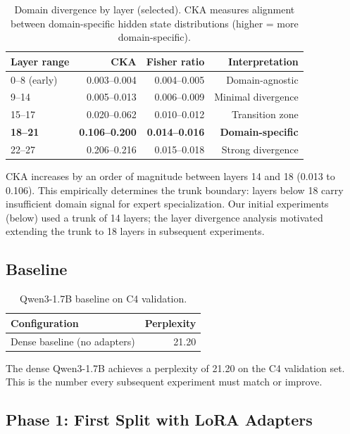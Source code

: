 \documentclass{article}
\begin{document}
\begin{table}[h]
\centering
\caption{Domain divergence by layer (selected). CKA measures alignment between
domain-specific hidden state distributions (higher = more domain-specific).}
\label{tab:divergence}
\begin{tabular}{@{}lrrr@{}}
\toprule
Layer range & CKA & Fisher ratio & Interpretation \\
\midrule
0--8 (early) & 0.003--0.004 & 0.004--0.005 & Domain-agnostic \\
9--14        & 0.005--0.013 & 0.006--0.009 & Minimal divergence \\
15--17       & 0.020--0.062 & 0.010--0.012 & Transition zone \\
\textbf{18--21} & \textbf{0.106--0.200} & \textbf{0.014--0.016} & \textbf{Domain-specific} \\
22--27       & 0.206--0.216 & 0.015--0.018 & Strong divergence \\
\bottomrule
\end{tabular}
\end{table}

CKA increases by an order of magnitude between layers 14 and 18 (0.013 to
0.106). This empirically determines the trunk boundary: layers below 18 carry
insufficient domain signal for expert specialization. Our initial experiments
(below) used a trunk of 14 layers;
the layer divergence analysis motivated extending the trunk to 18 layers in
subsequent experiments.

\subsection{Baseline}

\begin{table}[h]
\centering
\caption{Qwen3-1.7B baseline on C4 validation.}
\label{tab:baseline}
\begin{tabular}{@{}lr@{}}
\toprule
Configuration & Perplexity \\
\midrule
Dense baseline (no adapters) & 21.20 \\
\bottomrule
\end{tabular}
\end{table}

The dense Qwen3-1.7B achieves a perplexity of 21.20 on the C4 validation set.
This is the number every subsequent experiment must match or improve.

\subsection{Phase 1: First Split with LoRA Adapters}
\end{document}

